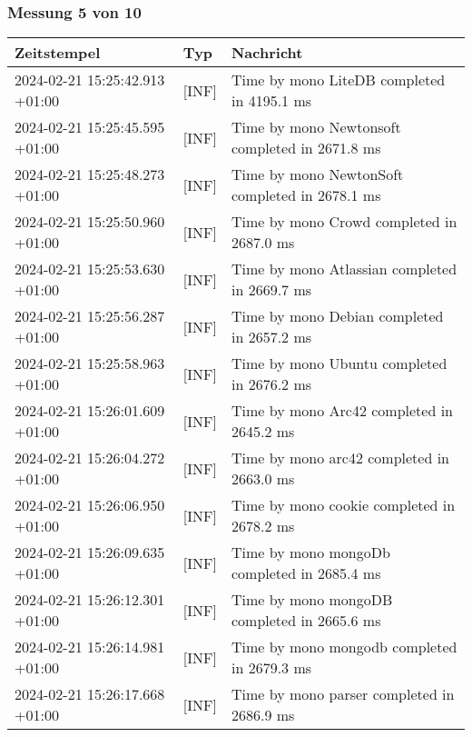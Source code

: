     \subsubsection*{Messung 5 von 10} \label{subsubsec:LiteDbMehrPaketeAlsDb5von10}
        {
            {\small
                \begin{tabularx}{\textwidth}{|l|l|X|}
                    \hline
                    \textbf{Zeitstempel} & \textbf{Typ} & \textbf{Nachricht} \\
                    \hline
                    \endhead
                    2024-02-21 15:25:42.913 +01:00 & [INF] & Time by mono LiteDB completed in 4195.1 ms \\
                    2024-02-21 15:25:45.595 +01:00 & [INF] & Time by mono Newtonsoft completed in 2671.8 ms \\
                    2024-02-21 15:25:48.273 +01:00 & [INF] & Time by mono NewtonSoft completed in 2678.1 ms \\
                    2024-02-21 15:25:50.960 +01:00 & [INF] & Time by mono Crowd completed in 2687.0 ms \\
                    2024-02-21 15:25:53.630 +01:00 & [INF] & Time by mono Atlassian completed in 2669.7 ms \\
                    2024-02-21 15:25:56.287 +01:00 & [INF] & Time by mono Debian completed in 2657.2 ms \\
                    2024-02-21 15:25:58.963 +01:00 & [INF] & Time by mono Ubuntu completed in 2676.2 ms \\
                    2024-02-21 15:26:01.609 +01:00 & [INF] & Time by mono Arc42 completed in 2645.2 ms \\
                    2024-02-21 15:26:04.272 +01:00 & [INF] & Time by mono arc42 completed in 2663.0 ms \\
                    2024-02-21 15:26:06.950 +01:00 & [INF] & Time by mono cookie completed in 2678.2 ms \\
                    2024-02-21 15:26:09.635 +01:00 & [INF] & Time by mono mongoDb completed in 2685.4 ms \\
                    2024-02-21 15:26:12.301 +01:00 & [INF] & Time by mono mongoDB completed in 2665.6 ms \\
                    2024-02-21 15:26:14.981 +01:00 & [INF] & Time by mono mongodb completed in 2679.3 ms \\
                    2024-02-21 15:26:17.668 +01:00 & [INF] & Time by mono parser completed in 2686.9 ms \\

\end{tabularx}}}
